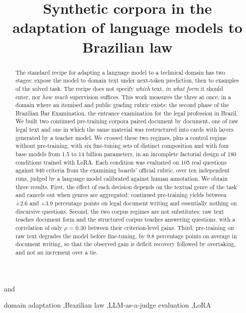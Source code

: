 \documentclass{IOS-Book-Article}
\begin{document}
\begin{frontmatter}
\title{Synthetic corpora in the adaptation of language models to Brazilian law}
\author[A]{ }
and
\author[A]{ }
\address[A]{Instituto de Ciências Matemáticas e de Computação, Universidade de São Paulo}
\begin{abstract}
The standard recipe for adapting a language model to a technical domain has two stages: expose the model to domain text under next-token prediction, then to examples of the solved task. The recipe does not specify \emph{which} text, \emph{in what form} it should enter, nor \emph{how much} supervision suffices. This work measures the three at once, in a domain where an itemised and public grading rubric exists: the second phase of the Brazilian Bar Examination, the entrance examination for the legal profession in Brazil. We built two continued pre-training corpora paired document by document, one of raw legal text and one in which the same material was restructured into cards with layers generated by a teacher model. We crossed these two regimes, plus a control regime without pre-training, with six fine-tuning sets of distinct composition and with four base models from 1.5 to 14 billion parameters, in an incomplete factorial design of 180 conditions trained with LoRA. Each condition was evaluated on 105 real questions against 940 criteria from the examining boards' official rubric, over ten independent runs, judged by a language model calibrated against human annotation. We obtain three results. First, the effect of each decision depends on the textual genre of the task and cancels out when genres are aggregated: continued pre-training yields between +2.6 and +3.9 percentage points on legal document writing and essentially nothing on discursive questions. Second, the two corpus regimes are not substitutes: raw text teaches document form and the structured corpus teaches answering questions, with a correlation of only $\rho$ = 0.30 between their criterion-level gains. Third, pre-training on raw text degrades the model before fine-tuning, by 9.8 percentage points on average in document writing, so that the observed gain is deficit recovery followed by overtaking, and not an increment over a tie.
\end{abstract}
\begin{keyword}
domain adaptation \sep Brazilian law \sep LLM-as-a-judge evaluation \sep LoRA
\end{keyword}
\end{frontmatter}
\end{document}
